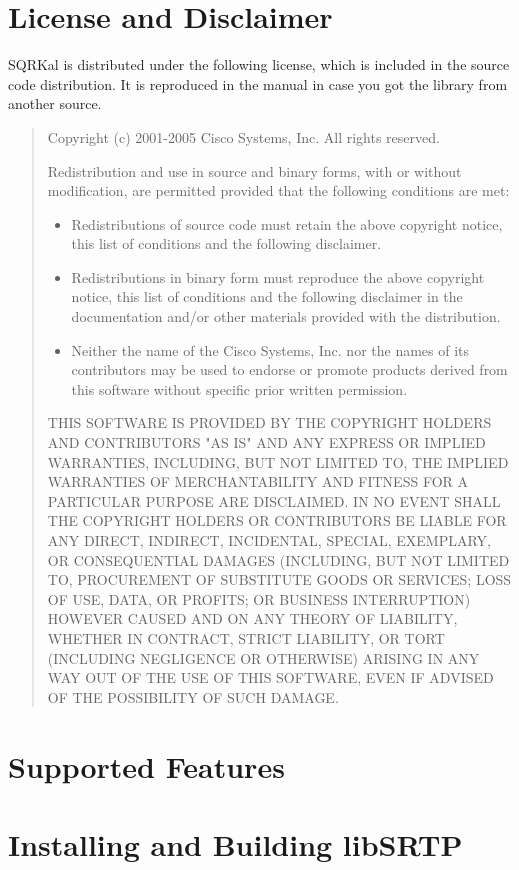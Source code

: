 \hypertarget{main_LICENSE}{}\section{License and Disclaimer}\label{main_LICENSE}
SQRKal is distributed under the following license, which is included in the source code distribution. It is reproduced in the manual in case you got the library from another source.

 
\begin{quote}
Copyright (c) 2001-2005 Cisco Systems, Inc.  All rights reserved.

Redistribution and use in source and binary forms, with or without
modification, are permitted provided that the following conditions
are met:
\begin{itemize}
\item  Redistributions of source code must retain the above copyright
  notice, this list of conditions and the following disclaimer.
\item Redistributions in binary form must reproduce the above
  copyright notice, this list of conditions and the following
  disclaimer in the documentation and/or other materials provided
  with the distribution.
\item Neither the name of the Cisco Systems, Inc. nor the names of its
  contributors may be used to endorse or promote products derived
  from this software without specific prior written permission.
\end{itemize}
THIS SOFTWARE IS PROVIDED BY THE COPYRIGHT HOLDERS AND CONTRIBUTORS
"AS IS" AND ANY EXPRESS OR IMPLIED WARRANTIES, INCLUDING, BUT NOT
LIMITED TO, THE IMPLIED WARRANTIES OF MERCHANTABILITY AND FITNESS
FOR A PARTICULAR PURPOSE ARE DISCLAIMED. IN NO EVENT SHALL THE
COPYRIGHT HOLDERS OR CONTRIBUTORS BE LIABLE FOR ANY DIRECT,
INDIRECT, INCIDENTAL, SPECIAL, EXEMPLARY, OR CONSEQUENTIAL DAMAGES
(INCLUDING, BUT NOT LIMITED TO, PROCUREMENT OF SUBSTITUTE GOODS OR
SERVICES; LOSS OF USE, DATA, OR PROFITS; OR BUSINESS INTERRUPTION)
HOWEVER CAUSED AND ON ANY THEORY OF LIABILITY, WHETHER IN CONTRACT,
STRICT LIABILITY, OR TORT (INCLUDING NEGLIGENCE OR OTHERWISE)
ARISING IN ANY WAY OUT OF THE USE OF THIS SOFTWARE, EVEN IF ADVISED
OF THE POSSIBILITY OF SUCH DAMAGE.
\end{quote}
\hypertarget{main_Features}{}\section{Supported Features}\label{main_Features}
\hypertarget{main_Installing}{}\section{Installing and Building libSRTP}\label{main_Installing}
 

